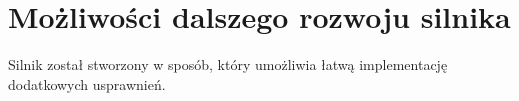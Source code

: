 \section {Możliwości dalszego rozwoju silnika}
\label {sec: dalszy-rozwoj}

Silnik został stworzony w sposób, który umożliwia łatwą implementację dodatkowych usprawnień.
